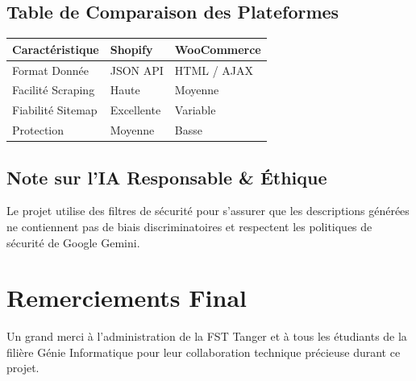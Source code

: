 \documentclass[11pt,a4paper,oneside]{report}
\begin{document}
    \section{Table de Comparaison des Plateformes}
    \begin{longtable}{lll}
    \toprule
    Caractéristique & Shopify & WooCommerce \\
    \midrule
    Format Donnée & JSON API & HTML / AJAX \\
    Facilité Scraping & Haute & Moyenne \\
    Fiabilité Sitemap & Excellente & Variable \\
    Protection & Moyenne & Basse \\
    \bottomrule
    \end{longtable}

    \section{Note sur l'IA Responsable & Éthique}
    Le projet utilise des filtres de sécurité pour s'assurer que les descriptions générées ne contiennent pas de biais discriminatoires et respectent les politiques de sécurité de Google Gemini.

    \chapter*{Remerciements Final}
    Un grand merci à l'administration de la FST Tanger et à tous les étudiants de la filière Génie Informatique pour leur collaboration technique précieuse durant ce projet.

    
\end{document}

